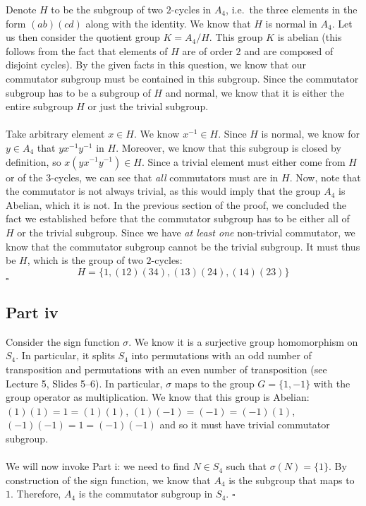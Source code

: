\documentclass[letterpaper]{article}
\newcommand*{\QED}{\hfill\ensuremath{\square}}%
\begin{document}
Denote $ H $ to be the subgroup of two $ 2 $-cycles in $ A_4 $, i.e.\ the three elements in the form $ (ab)(cd) $ along with the identity.
We know that $ H $ is normal in $ A_4 $.
Let us then consider the quotient group $ K = A_4 / H $.
This group $ K $ is abelian (this follows from the fact that elements of $ H $ are of order $ 2 $ and are composed of disjoint cycles).
By the given facts in this question, we know that our commutator subgroup must be contained in this subgroup.
Since the commutator subgroup has to be a subgroup of $ H $ and normal, we know that it is either the entire subgroup $ H $ or just the trivial subgroup.
\\ \\
Take arbitrary element $ x \in H $.
We know $ x^{-1} \in H $.
Since $ H $ is normal, we know for $ y \in A_4 $ that $ yx^{-1}y^{-1} $ in $ H $.
Moreover, we know that this subgroup is closed by definition, so $ x\left(yx^{-1}y^{-1} \right) \in H $.
Since a trivial element must either come from $ H $ or of the $ 3 $-cycles, we can see that \textit{all} commutators must are in $ H $.
Now, note that the commutator is not always trivial, as this would imply that the group $ A_4 $ is Abelian, which it is not.
In the previous section of the proof, we concluded the fact we established before that the commutator subgroup has to be either all of $ H $ or the trivial subgroup.
Since we have \textit{at least one} non-trivial commutator, we know that the commutator subgroup cannot be the trivial subgroup.
It must thus be $ H $, which is the group of two $ 2 $-cycles:
\[
H = \{1, (12)(34), (13)(24), (14)(23) \}
\]
\QED{}

\subsection{Part iv}
\label{subs:8Partiv}

Consider the sign function $ \sigma $.
We know it is a surjective group homomorphism on $ S_4 $.
In particular, it splits $ S_4 $ into permutations with an odd number of transposition and permutations with an even number of transposition (see Lecture 5, Slides 5--6).
In particular, $ \sigma $ maps to the group $ G = \{1, -1\} $ with the group operator as multiplication.
We know that this group is Abelian: $ (1)(1) = 1 = (1)(1) $, $ (1)(-1) = (-1) = (-1)(1) $, $ (-1)(-1) = 1 = (-1)(-1) $ and so it must have trivial commutator subgroup.
\\ \\
We will now invoke Part i: we need to find $ N \in S_4 $ such that $ \sigma(N) = \{1\} $.
By construction of the sign function, we know that $ A_4 $ is the subgroup that maps to $ 1 $.
Therefore, $ A_4 $ is the commutator subgroup in $ S_4 $.
\QED{}
\end{document}
